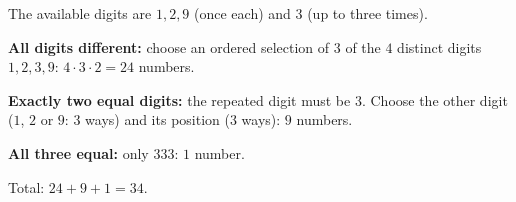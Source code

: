 The available digits are $1,2,9$ (once each) and $3$ (up to three times).

\textbf{All digits different:} choose an ordered selection of $3$ of the $4$ distinct digits $1,2,3,9$: $4\cdot3\cdot2=24$ numbers.

\textbf{Exactly two equal digits:} the repeated digit must be $3$. Choose the other digit ($1$, $2$ or $9$: $3$ ways) and its position ($3$ ways): $9$ numbers.

\textbf{All three equal:} only $333$: $1$ number.

Total: $24+9+1=\boxed{34}$.
